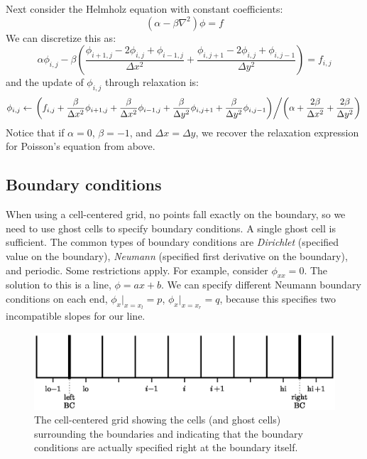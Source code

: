 Next consider the Helmholz equation with constant coefficients:
\begin{equation}
(\alpha - \beta \nabla^2) \phi = f
\end{equation}
We can discretize this as:
\begin{equation}
\alpha \phi_{i,j} - \beta \left ( 
    \frac{\phi_{i+1,j} - 2 \phi_{i,j} + \phi_{i-1,j}}{\Delta x^2} +
    \frac{\phi_{i,j+1} - 2 \phi_{i,j} + \phi_{i,j-1}}{\Delta y^2} \right )
= f_{i,j}
\end{equation}
and the update of $\phi_{i,j}$ through relaxation is:
\begin{equation}
\phi_{i,j} \leftarrow
     \left . \left ( f_{i,j} + \frac{\beta}{\Delta x^2} \phi_{i+1,j}
                             + \frac{\beta}{\Delta x^2} \phi_{i-1,j}
                             + \frac{\beta}{\Delta y^2} \phi_{i,j+1}
                             + \frac{\beta}{\Delta y^2} \phi_{i,j-1} \right ) 
\middle / \left ( \alpha + \frac{2 \beta}{\Delta x^2} + \frac{2 \beta}{\Delta y^2} \right ) \right .
\end{equation}
Notice that if $\alpha = 0$, $\beta = -1$, and $\Delta x = \Delta y$, we 
recover the relaxation expression for Poisson's equation from above.


\subsection{Boundary conditions}

When using a cell-centered grid, no points fall exactly on the
boundary, so we need to use ghost cells to specify boundary conditions.
A single ghost cell is sufficient.  The common types of boundary
conditions are {\em Dirichlet} (specified value on the boundary), {\em
  Neumann} (specified first derivative on the boundary), and periodic.
Some restrictions apply.  For example, consider $\phi_{xx} = 0$.  The
solution to this is a line, $\phi = ax + b$.  We can specify different
Neumann boundary conditions on each end, $\phi_x |_{x=x_l} = p$,
$\phi_x |_{x = x_r} = q$, because this specifies two incompatible
slopes for our line.

\begin{figure}[h]
\centering
\includegraphics[width=6.0in]{mg-bcs}
\caption[The cell-centered grid showing the difference between ghost
  cells and the physical boundary.]{\label{fig:bcs} The cell-centered
  grid showing the cells (and ghost cells) surrounding the boundaries
  and indicating that the boundary conditions are actually specified
  right at the boundary itself.}
\end{figure}


